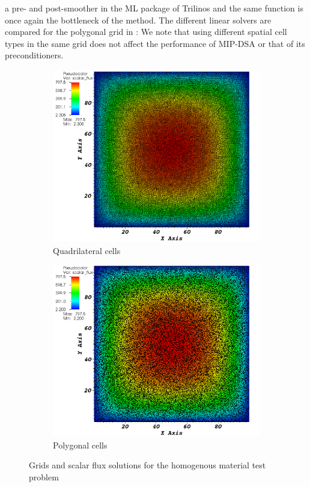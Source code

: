 a pre- and post-smoother in the ML package of Trilinos and the same function
is once again the bottleneck of the method.
%
The different linear solvers are compared for the polygonal grid in :
We note that using different spatial cell types in the same grid does not affect
the performance of MIP-DSA or that of its preconditioners.
%
\begin{figure}[!htbp]
  \centering
  \begin{subfigure}{0.75\textwidth}
    \centering
    \includegraphics[width=\textwidth]{big_homog_quad_crop}
    \caption{Quadrilateral cells}
  \end{subfigure}
  \begin{subfigure}{0.75\textwidth}
    \centering
    \includegraphics[width=\textwidth]{big_homog_poly_crop}
    \caption{Polygonal cells}
  \end{subfigure}
  \caption{Grids and scalar flux solutions for the homogenous material test problem}
  \label{homog_test}
\end{figure}

